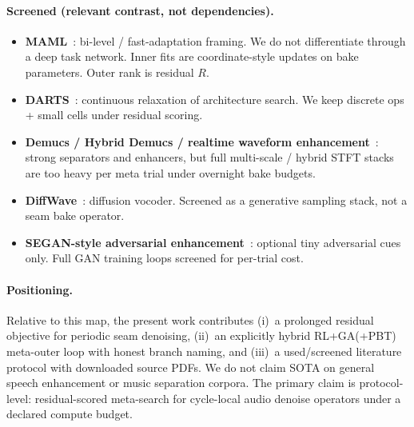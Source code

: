 \paragraph{Screened (relevant contrast, not dependencies).}
\begin{itemize}
  \item \textbf{MAML}~\cite{finn2017}: bi-level / fast-adaptation framing. We do not differentiate through a deep task network. Inner fits are coordinate-style updates on bake parameters. Outer rank is residual $R$.
  \item \textbf{DARTS}~\cite{liu2019}: continuous relaxation of architecture search. We keep discrete ops + small cells under residual scoring.
  \item \textbf{Demucs / Hybrid Demucs / realtime waveform enhancement}~\cite{dfossez2019,dfossez2021,dfossez2020}: strong separators and enhancers, but full multi-scale / hybrid STFT stacks are too heavy per meta trial under overnight bake budgets.
  \item \textbf{DiffWave}~\cite{kong2021}: diffusion vocoder. Screened as a generative sampling stack, not a seam bake operator.
  \item \textbf{SEGAN-style adversarial enhancement}~\cite{pascual2017}: optional tiny adversarial cues only. Full GAN training loops screened for per-trial cost.
\end{itemize}

\paragraph{Positioning.}
Relative to this map, the present work contributes (i)~a prolonged residual objective for periodic seam denoising, (ii)~an explicitly hybrid RL+GA(+PBT) meta-outer loop with honest branch naming, and (iii)~a used/screened literature protocol with downloaded source PDFs.
We do not claim SOTA on general speech enhancement or music separation corpora.
The primary claim is protocol-level: residual-scored meta-search for cycle-local audio denoise operators under a declared compute budget.
